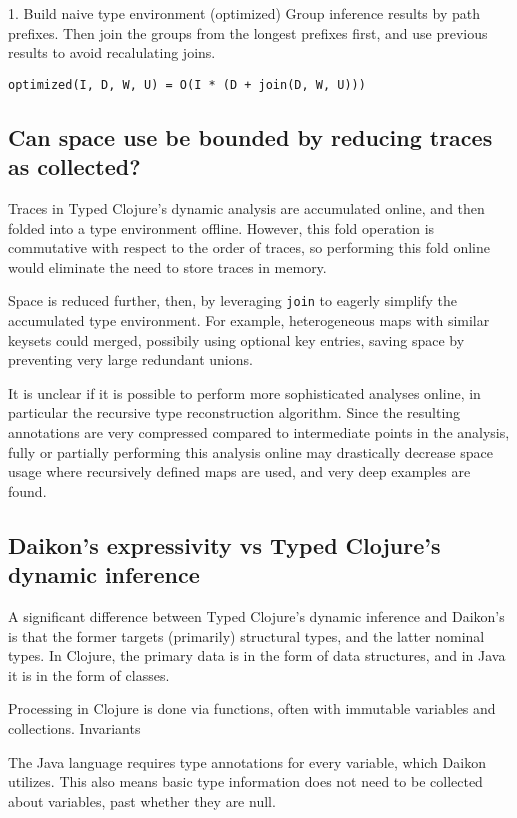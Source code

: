 \documentclass[10pt]{article}
\begin{document}
1. Build naive type environment (optimized)
	Group inference results by path prefixes. Then join the groups
	from the longest prefixes first, and use previous results to avoid
	recalulating joins.

\begin{verbatim}
optimized(I, D, W, U) = O(I * (D + join(D, W, U)))
\end{verbatim}

\subsection*{Can space use be bounded by reducing traces as collected?}

Traces in Typed Clojure's dynamic analysis are accumulated online, and then
folded into a type environment offline. However, this fold operation is commutative
with respect to the order of traces, so performing this fold online would
eliminate the need to store traces in memory.

Space is reduced further, then, by leveraging \texttt{join} to eagerly simplify
the accumulated type environment. For example, heterogeneous maps with similar
keysets could merged, possibily using optional key entries, saving space by
preventing very large redundant unions.

It is unclear if it is possible to perform more sophisticated analyses online,
in particular the recursive type reconstruction algorithm. Since the resulting
annotations are very compressed compared to intermediate points in the analysis,
fully or partially performing this analysis online may drastically decrease space
usage where recursively defined maps are used, and very deep examples are found.

\subsection*{Daikon's expressivity vs Typed Clojure's dynamic inference}

A significant difference between Typed Clojure's dynamic inference and Daikon's
is that the former targets (primarily) structural types, and the latter
nominal types. In Clojure, the primary data is in the form of data structures,
and in Java it is in the form of classes.

Processing in Clojure is done via functions, often with immutable variables and collections.
Invariants 

The Java language requires type annotations for every variable, which Daikon utilizes.
This also means basic type information does not need to be collected about variables,
past whether they are null.
\end{document}
